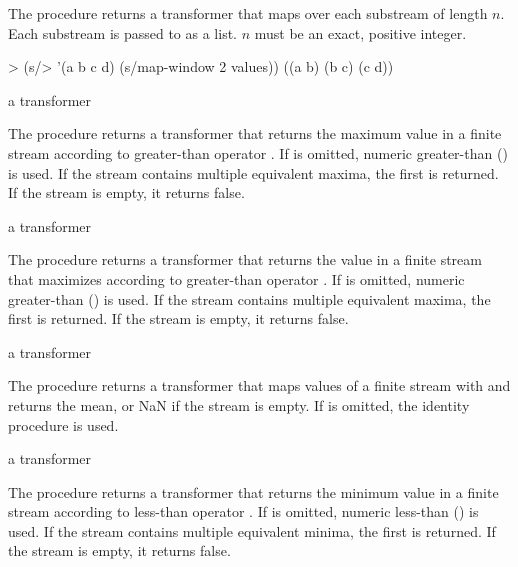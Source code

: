 The  procedure returns a transformer that maps over each substream of
length $n$. Each substream is passed to  as a list. $n$ must be an exact,
positive integer.

\codebegin
> (s/> '(a b c d) (s/map-window 2 values))
((a b) (b c) (c d))
\codeend

\begin{procedure}
\end{procedure}
\returns{} a transformer

The  procedure returns a transformer that returns the maximum value in a
finite stream according to greater-than operator . If  is omitted, numeric
greater-than (\code{>}) is used. If the stream contains multiple equivalent maxima, the
first is returned. If the stream is empty, it returns false.

\begin{procedure}
\end{procedure}
\returns{} a transformer

The  procedure returns a transformer that returns the value  in a
finite stream that maximizes  according to greater-than
operator . If  is omitted, numeric greater-than (\code{>}) is used. If the
stream contains multiple equivalent maxima, the first is returned. If the stream is empty,
it returns false.

\begin{procedure}
\end{procedure}
\returns{} a transformer

The  procedure returns a transformer that maps values of a finite stream with
 and returns the mean, or NaN if the stream is empty. If  is
omitted, the identity procedure is used.

\begin{procedure}
\end{procedure}
\returns{} a transformer

The  procedure returns a transformer that returns the minimum value in a
finite stream according to less-than operator . If  is omitted, numeric
less-than (\code{<}) is used. If the stream contains multiple equivalent minima, the first
is returned. If the stream is empty, it returns false.


